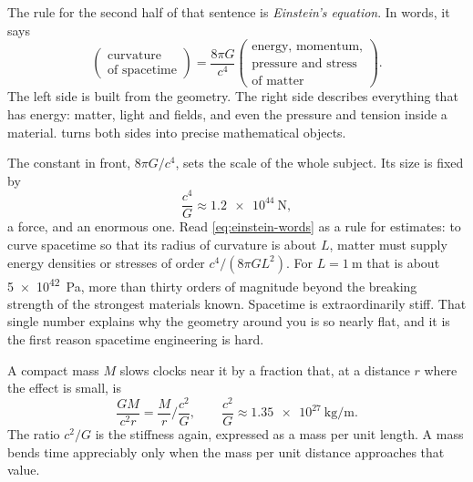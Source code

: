 The rule for the second half of that sentence is \emph{Einstein's equation}.
In words, it says
\begin{equation}
  \begin{pmatrix}\text{curvature}\\ \text{of spacetime}\end{pmatrix}
  = \frac{8\pi G}{c^{4}}
  \begin{pmatrix}\text{energy, momentum,}\\ \text{pressure and stress}\\
  \text{of matter}\end{pmatrix}.
  \label{eq:einstein-words}
\end{equation}
The left side is built from the geometry. The right side describes
everything that has energy: matter, light and fields, and even the pressure
and tension inside a material.  turns both sides into
precise mathematical objects.

The constant in front, $8\pi G/c^{4}$, sets the scale of the whole subject.
Its size is fixed by
\begin{equation}
  \frac{c^{4}}{G} \approx \SI{1.2e44}{\newton},
  \label{eq:stiffness}
\end{equation}
a force, and an enormous one. Read \cref{eq:einstein-words} as a rule for
estimates: to curve spacetime so that its radius of curvature is about $L$,
matter must supply energy densities or stresses of order
$c^{4}/(8\pi G L^{2})$. For $L = \SI{1}{\metre}$ that is about
\SI{5e42}{\pascal}, more than thirty orders of magnitude beyond the breaking
strength of the strongest materials known. Spacetime is extraordinarily stiff.
That single number explains why the geometry around you is so nearly flat, and
it is the first reason spacetime engineering is hard.

A compact mass $M$ slows clocks near it by a fraction that, at a distance $r$
where the effect is small, is
\begin{equation}
  \frac{GM}{c^{2}r} = \frac{M}{r}\Big/\frac{c^{2}}{G},
  \qquad
  \frac{c^{2}}{G} \approx \SI{1.35e27}{\kilogram\per\metre}.
  \label{eq:clock-slowing}
\end{equation}
The ratio $c^{2}/G$ is the stiffness again, expressed as a mass per unit
length. A mass bends time appreciably only when the mass per unit distance
approaches that value.

